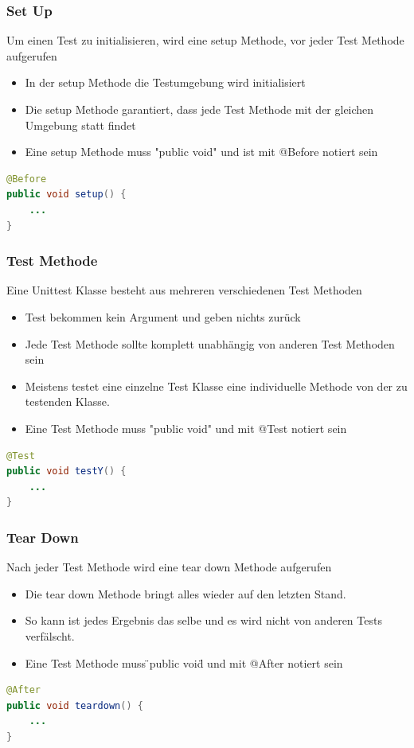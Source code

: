 \documentclass[a4paper,10pt]{article}
\begin{document}
\subsubsection{Set Up}
Um einen Test zu initialisieren, wird eine setup Methode, vor jeder Test Methode  aufgerufen
\begin{itemize}
	\item In der setup Methode die Testumgebung wird initialisiert
	\item Die setup Methode garantiert, dass jede Test Methode mit der gleichen Umgebung statt findet
	\item Eine setup Methode muss "public void" und ist mit @Before notiert sein 
\end{itemize}
\begin{lstlisting}[language=Java,caption=Unit Test (Before), style=MyJavaStyle]
@Before
public void setup() {
	... 
}
\end{lstlisting}

\subsubsection{Test Methode}
Eine Unittest Klasse besteht aus mehreren verschiedenen Test Methoden
\begin{itemize}
	\item Test bekommen kein Argument und geben nichts zur\"{u}ck
	\item Jede Test Methode sollte komplett unabh\"{a}ngig von anderen Test Methoden sein
	\item Meistens testet eine einzelne Test Klasse eine individuelle Methode von der zu testenden Klasse.
	\item Eine Test Methode muss "public void" und mit @Test notiert sein
\end{itemize}
\begin{lstlisting}[language=Java,caption=Unit Test (Test), style=MyJavaStyle]
@Test
public void testY() {
	... 
}
\end{lstlisting}

\subsubsection{Tear Down}
Nach jeder Test Methode wird eine tear down Methode aufgerufen
\begin{itemize}
	\item Die tear down Methode bringt alles wieder auf den letzten Stand.
	\item So kann ist jedes Ergebnis das selbe und es wird nicht von anderen Tests verf\"{a}lscht.
	\item Eine Test Methode muss \"{ }public void\"{ } und mit @After notiert sein
\end{itemize}
\begin{lstlisting}[language=Java,caption=Unit Test (After), style=MyJavaStyle]
@After
public void teardown() {
	... 
}
\end{lstlisting}
\end{document}
